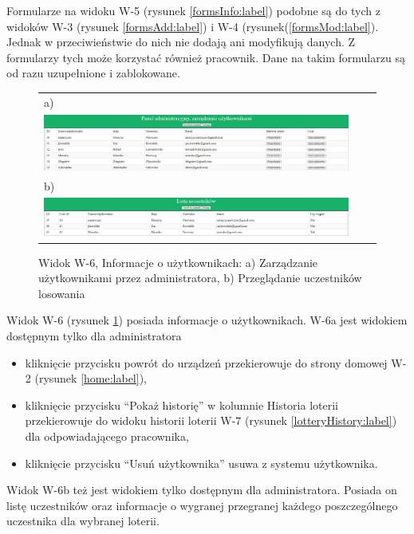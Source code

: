 Formularze na widoku W-5 (rysunek \ref{formsInfo:label}) podobne są do tych z widoków W-3 (rysunek \ref{formsAdd:label}) i W-4 (rysunek(\ref{formsMod:label}). Jednak w przeciwieństwie do nich nie dodają ani modyfikują danych. Z formularzy tych może korzystać również pracownik. Dane na takim formularzu są od razu uzupełnione i zablokowane. 

\begin{figure}[H]
  \centering
	\begin{tabular}{@{}lll@{}}
	a)\\
  \includegraphics[width=\textwidth]{rys05/view/manageUsers.pdf} \\
	
	b)\\
	\includegraphics[width=\textwidth]{rys05/view/participation.pdf} \\
	
	\end{tabular}
  \caption{Widok W-6, Informacje o użytkownikach: a) Zarządzanie użytkownikami przez administratora, b) Przeglądanie uczestników losowania}
  \label{manageUsers:label}
\end{figure}


Widok W-6 (rysunek \ref{manageUsers:label}) posiada informacje o użytkownikach. W-6a jest widokiem dostępnym tylko dla administratora
\begin{itemize}
	\item kliknięcie przycisku powrót do urządzeń przekierowuje do strony domowej W-2 (rysunek \ref{home:label}),
	\item kliknięcie przycisku "`Pokaż historię"' w kolumnie Historia loterii przekierowuje do widoku historii loterii  W-7 (rysunek \ref{lotteryHistory:label}) dla odpowiadającego pracownika,
	\item kliknięcie przycisku "`Usuń użytkownika"' usuwa z systemu użytkownika.
\end{itemize}
Widok W-6b też jest widokiem tylko dostępnym dla administratora. Posiada on listę uczestników oraz informacje o wygranej przegranej każdego poszczególnego uczestnika dla wybranej loterii.


